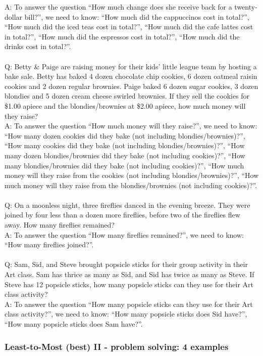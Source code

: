 A: To answer the question ``How much change does she receive back for a twenty-dollar bill?'', we need to know: ``How much did the cappuccinos cost in total?'', ``How much did the iced teas cost in total?'', ``How much did the cafe lattes cost in total?'', ``How much did the espressos cost in total?'', ``How much did the drinks cost in total?''. \\
 \\
Q: Betty \& Paige are raising money for their kids' little league team by hosting a bake sale. Betty has baked 4 dozen chocolate chip cookies, 6 dozen oatmeal raisin cookies and 2 dozen regular brownies. Paige baked 6 dozen sugar cookies, 3 dozen blondies and 5 dozen cream cheese swirled brownies. If they sell the cookies for \$1.00 apiece and the blondies/brownies at \$2.00 apiece, how much money will they raise? \\
A: To answer the question ``How much money will they raise?'', we need to know: ``How many dozen cookies did they bake (not including blondies/brownies)?'', ``How many cookies did they bake (not including blondies/brownies)?'', ``How many dozen blondies/brownies did they bake (not including cookies)?'', ``How many blondies/brownies did they bake (not including cookies)?'', ``How much money will they raise from the cookies (not including blondies/brownies)?'', ``How much money will they raise from the blondies/brownies (not including cookies)?''. \\
 \\
Q: On a moonless night, three fireflies danced in the evening breeze. They were joined by four less than a dozen more fireflies, before two of the fireflies flew away. How many fireflies remained? \\
A: To answer the question ``How many fireflies remained?'', we need to know: ``How many fireflies joined?''. \\
 \\
Q: Sam, Sid, and Steve brought popsicle sticks for their group activity in their Art class. Sam has thrice as many as Sid, and Sid has twice as many as Steve. If Steve has 12 popsicle sticks, how many popsicle sticks can they use for their Art class activity? \\
A: To answer the question ``How many popsicle sticks can they use for their Art class activity?'', we need to know: ``How many popsicle sticks does Sid have?'', ``How many popsicle sticks does Sam have?''. \\

\subsubsection{Least-to-Most (best) II - problem solving: 4 examples}

